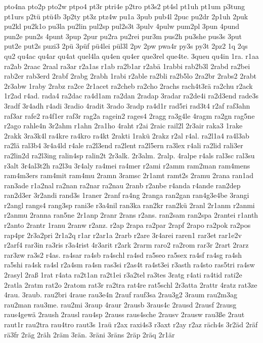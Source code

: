 {pto4na
pto2p
pto2w
ptpo4
pt3r
ptri4e
p2tro
pt3s2
pt4sl
pt1uh
pt1um
p3tung
pt1urs
p2tü
ptü4b
3p2ty
pt3z
ptz4w
pu1a
3pub
pub4l
2puc
pu2dr
2p1uh
2puk
pu2kl
pu2k1o
pu3la
pu2lin
pul2sp
pul2s3t
3pulv
4pulw
pum2pl
3pun
4pund
pun2e
pun2s
4punt
3pup
2pur
pu2ra
pu2rei
pur3m
pus2h
pu3she
pus3s
3put
put2e
put2s
puzi3
2pü
3püf
pü4lei
pül3l
2pv
2pw
pwa4r
py3s
py3t
2pz2
1q
2qs
qu2
qu4ac
qu4ar
qu4at
quel4la
qu4en
qu4er
que3rel
que4te.
3queu
qu4in
1ra.
r1aa
ra2ab
2raac
2raal
ra3ar
r2a1as
r1ab
ra2b1ar
r2abä
1rabbi
rab2b3l
2rabd
ra2bei
rab2er
rab3erd
2rabf
2rabg
2rabh
1rabi
r2able
ra2bli
ra2b5lo
2ra2br
2rabs2
2rabt
2r3abw
1raby
2rabz
ra2ce
2r1acet
ra2cheb
ra2cho
2rachs
rach4t3rä
ra2chu
r2ack
1r2ad
r4ad.
rada4
ra2dac
ra4d1am
ra2dan
2radap
3radar
ra2de4i
ra2d3end
rade3s
3radf
3r4adh
r4adi
3radio
4radit
3rado
3radp
ra4d1r
rad5ri
rad3t4
r2af
raf3ahn
raf3ar
rafe2
ra4f1er
raf3r
rag2a
ragein2
rages4
2ragg
ra3g4le
4ragm
ra2gn
rag5ne
r2ago
rahle4n
3r2ahm
r1ahn
2ra1ho
4raht
r2ai
2raic
rail2l
2r3air
raka3
1rake
2rakk
3ra3k4l
ra4kre
ra4kro
ra4kt
2rakti
1rakü
2rakz
r2al
r4al.
ra2l1a4
ra4l3ab
ra2lä
ral3b4
3r4a4ld
r4ale
ra2l3end
ra2lent
ra2l5ern
ra3lex
r4ali
ra2lid
rali3er
ra2lin2d
ra2l3ing
ralin4sp
ralin2t
2r3alk.
2r3alm.
2ralp.
4ralpe
r4als
ral3sc
ral3su
r3alt
3r4al3t2h
ra2l3u
3r4aly
ra4mei
ra4mer
r2ami
r2amm
ram2man
ram4mens
ram4m3ers
ram4mit
ram4mu
2ramn
3ramsc
2r1amt
ramt2s
2ramu
2rana
ran1ad
ran3ade
r1a2nal
ra2nan
ra2nar
ra2nau
2ranb
r2anbe
r4anda
r4ande
ran2dep
ran2d3er
3r2andi
rand3s
1raner
2ranf
ra4ng
2ranga
ran2gan
ran4g3e4be
3rangi
r2angl
rangs4
rang3sp
rani3e
r3a4nil
ran3ka
ran2kr
ran2kü
2ranl
2r1anm
r2anmi
r2anmu
2ranna
ran5ne
2r1anp
2ranr
2rans
r2ans.
ran2sam
ran2spa
2rantei
r1anth
r2anto
2rantr
1ranu
2ranw
r2anz.
r2ap
2rapa
ra2par
2rapf
2rapo
ra2pok
ra2pos
rap4pr
2r3a2pri
2r1a2q
r1ar
r2ar1a
2rarb
r2are
3r4arei
raren1
rar3et
rar1e2v
r2arf4
rar3in
ra3ris
r3a4rist
4r3arit
r2ark
2rarm
raro2
ra2rom
rar3r
2rart
2rarz
rar3zw
ra3s2
r4as.
ra4sar
ra4sb
ra4schl
ra4sd
ra5seo
ra5sex
ra4sf
ra4sg
ra4sh
ra5shi
ra4sk
ra4sl
r2a4sm
ra4sn
ras3si
r2as4t
ra4st3ei
r3asth
ra4sto
ras5tri
ra4sw
2rasyl
2raß
1rat
r4ata
ra2t1an
ra2t1ei
r3a2tel
ra3tes
3ratg
r4ati
ra4tid
rati2e
2ratla
2ratm
rat2o
2ratom
rat3r
ra2tra
rat4re
rat5schl
2r3atta
2rattr
4ratz
rat3ze
4rau.
3raub.
rau2bri
4raue
rau3e4n
2rauf
rauf3sa
2rau3g2
3raum
rau2m3ag
rau2man
rau3me.
rau2mi
3raup
4raur
2rausb
3raus4c
2rausd
2rausf
2rausg
raus4gewä
2raush
2rausl
rau4sp
2rauss
raus4sche
2rausv
2rausw
rau3ße
2raut
raut1r
rau2tra
rau4tro
raut3s
1raü
r2ax
raxi4s3
r3axt
r2ay
r2az
räch4s
3r2äd
2räf
rä3fr
2räg
2räh
2räm
3rän.
3räni
3räns
2räp
2räq
2r1är
}
